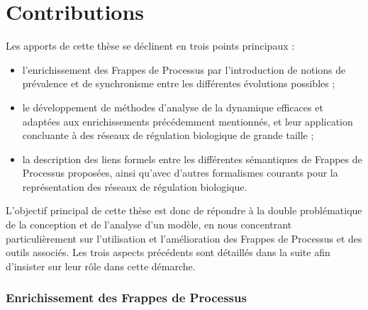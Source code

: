 \section{Contributions}

Les apports de cette thèse se déclinent en trois points principaux :
\begin{itemize}
  \item l'enrichissement des Frappes de Processus par l'introduction de notions
    de prévalence et de synchronisme entre les différentes évolutions possibles ;
  \item le développement de méthodes d'analyse de la dynamique efficaces
    et adaptées aux enrichissements précédemment mentionnés,
    et leur application concluante à des réseaux de régulation biologique de grande taille ;
  \item la description des liens formels entre les différentes sémantiques de Frappes de Processus
    proposées, ainsi qu'avec d'autres formalismes courants pour la représentation
    des réseaux de régulation biologique.
\end{itemize}
L'objectif principal de cette thèse est donc de répondre à la double problématique
de la conception et de l'analyse d'un modèle,
en nous concentrant particulièrement sur l'utilisation et l'amélioration
des Frappes de Processus et des outils associés.
Les trois aspects précédents sont détaillés dans la suite
afin d'insister sur leur rôle dans cette démarche.

\subsubsection*{Enrichissement des Frappes de Processus}

